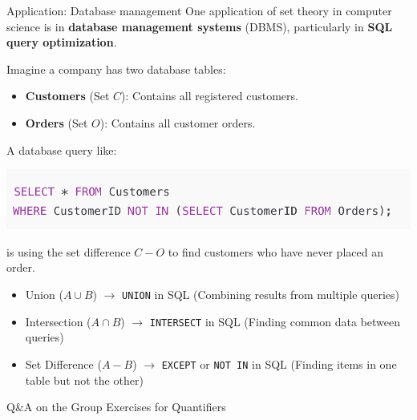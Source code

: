 \documentclass[10pt]{beamer}
\begin{document}
\begin{frame}{Application: Database management}
\footnotesize 
One application of set theory in computer science is in \textbf{database management systems} (DBMS), particularly in \textbf{SQL query optimization}.
\vfill 

\begin{mygreenbox}[title=Example]
Imagine a company has two database tables:

\begin{itemize}
\item \textbf{Customers} (Set $C$): Contains all registered customers.
\item \textbf{Orders} (Set $O$): Contains all customer orders.
\end{itemize}

A database query like:
\vspace{-.25cm}
\begin{center}
\includegraphics[width=.6\textwidth]{images/sql_query.png}	
\end{center}
\vspace{-.25cm}
is using the set difference $C-O$ to find customers who have never placed an order.
\end{mygreenbox}
\vfill

\begin{myyellowbox}[title=Key Set Operations in Databases]
\begin{itemize}
\item  Union ($A \cup B$)  $\to$ \texttt{UNION} in SQL (Combining results from multiple queries)
\item  Intersection ($A \cap B$)  $\to$ \texttt{INTERSECT} in SQL  (Finding common data between queries)
\item  Set Difference ($A - B$)  $\to$ \texttt{EXCEPT}  or \texttt{NOT IN} in SQL (Finding items in one table but not the other)	
\end{itemize}
\end{myyellowbox}


\end{frame}


\begin{frame}[standout]
Q\&A on the Group Exercises for Quantifiers
\end{frame}
\end{document}
